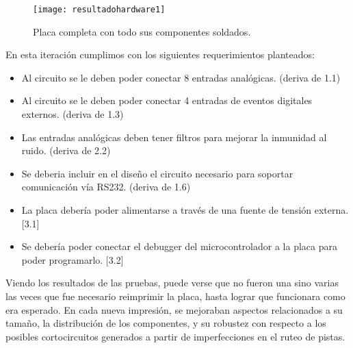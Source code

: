 \begin{figure}[h]
  \centering
  \texttt{[image: resultadohardware1]}
  \caption{Placa completa con todo sus componentes soldados.}\label{fig:resultadohardware1}
\end{figure}

En esta iteración cumplimos con los siguientes requerimientos planteados:
\begin{itemize}
  \item Al circuito se le deben poder conectar 8 entradas analógicas. (deriva de 1.1)
  \item Al circuito se le deben poder conectar 4 entradas de eventos digitales externos. (deriva de 1.3)
  \item Las entradas analógicas deben tener filtros para mejorar la inmunidad al ruido. (deriva de 2.2)
  \item Se deberia incluir en el diseño el circuito necesario para soportar comunicación vía RS232. (deriva de 1.6)
  \item La placa debería poder alimentarse a través de una fuente de tensión externa. [3.1]
  \item Se debería poder conectar el debugger del microcontrolador a la placa para poder programarlo. [3.2]
\end{itemize}

Viendo los resultados de las pruebas, puede verse que no fueron una sino varias las veces que fue necesario reimprimir la placa, hasta lograr que funcionara como era esperado. En cada nueva impresión, se mejoraban aspectos relacionados a su tamaño, la distribución de los componentes, y su robustez con respecto a los posibles cortocircuitos generados a partir de imperfecciones en el ruteo de pistas.


